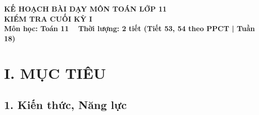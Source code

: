 \documentclass[12pt, a4paper]{article}
\begin{document}
\begin{center}
    {\fontsize{14pt}{17pt}\selectfont \textbf{KẾ HOẠCH BÀI DẠY MÔN TOÁN LỚP 11}}\\[6pt]
    {\fontsize{16pt}{19pt}\selectfont \textbf{KIỂM TRA CUỐI KỲ I}}\\[4pt]
    {\fontsize{12pt}{15pt}\selectfont \textbf{Môn học: Toán 11} \ \textbar \ \textbf{Thời lượng: 2 tiết (Tiết 53, 54 theo PPCT | Tuần 18)}}
\end{center}

\vspace{5pt}

\section*{I. MỤC TIÊU}

\subsection*{1. Kiến thức, Năng lực}
\end{document}

